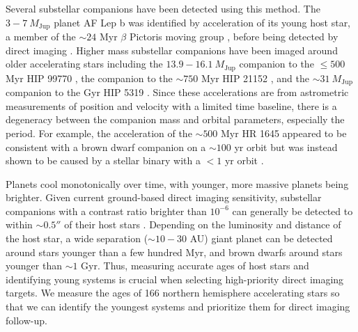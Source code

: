 Several substellar companions have been detected using this method. The $3-7 \ M_\textrm{Jup}$ planet AF Lep b was identified by  acceleration of its young host star, a member of the $\sim24$ Myr $\beta$ Pictoris moving group \citep{2015MNRAS.454..593B}, before being detected by direct imaging \citep{2023A&A...672A..94D, 2023A&A...672A..93M, 2023ApJ...950L..19F}. Higher mass substellar companions have been imaged around older accelerating stars including the $13.9-16.1 \ M_\textrm{Jup}$ companion to the $\le 500$ Myr HIP 99770 \citep{2023Sci...380..198C}, the  companion to the $\sim750$ Myr HIP 21152 \citep{2022ApJ...934L..18K}, and the $\sim31 \ M_\textrm{Jup}$ companion to the  Gyr HIP 5319 \citep{2022AJ....164..152S}. Since these accelerations are from astrometric measurements of position and velocity with a limited time baseline, there is a degeneracy between the companion mass and orbital parameters, especially the period. For example, the acceleration of the $\sim500$ Myr HR 1645 appeared to be consistent with a brown dwarf companion on a $\sim100$ yr orbit but was instead shown to be caused by a stellar binary with a $<1$ yr orbit \citep{2019AJ....158..226D}.

Planets cool monotonically over time, with younger, more massive planets being brighter. Given current ground-based direct imaging sensitivity, substellar companions with a contrast ratio brighter than $10^{-6}$ can generally be detected to within $\sim0.5''$ of their host stars . Depending on the luminosity and distance of the host star, a wide separation ($\sim10-30$ AU) giant planet can be detected around stars younger than a few hundred Myr, and brown dwarfs around stars younger than $\sim1$ Gyr. Thus, measuring accurate ages of host stars and identifying young systems is crucial when selecting high-priority direct imaging targets. We measure the ages of 166 northern hemisphere accelerating stars so that we can identify the youngest systems and prioritize them for direct imaging follow-up.


